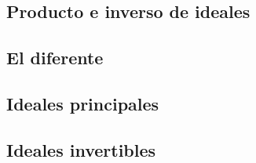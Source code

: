 
\subsection{Producto e inverso de ideales}

\subsection{El diferente}

\subsection{Ideales principales}

\subsection{Ideales invertibles}

